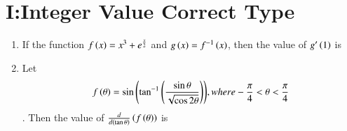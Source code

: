 \documentclass[journal,,12pt,twocolumn]{IEEEtran}
\theoremstyle{remark}
\begin{document}
\section*{I:Integer Value Correct Type}
\begin{enumerate}
    \item If the function $f\left(x\right)=x^3+e^{\frac{x}{2}}$ and $g\left(x\right)=f^{-1}\left(x\right)$, then the value of $g'\left(1\right)$ is 
    \hfill{}
    \item    Let \begin{align}f\left(\theta\right)=\sin{\ensuremath{\left(\tan^{-1}{\left(\frac{\sin{\theta}}{\sqrt{\cos{2\theta}}}\right)}\right)}} , where -\frac{\pi}{4}<\theta<\frac{\pi}{4}\end{align}. Then the value of $\frac{d}{d\left(\tan{\theta}\right)}\left(f\left(\theta\right)\right)$ is
\end{enumerate}  
\hfill{}
\end{document}
